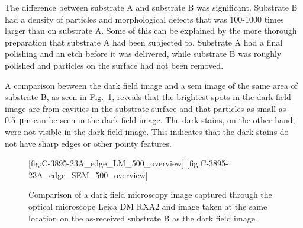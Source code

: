 The difference between substrate A and substrate B was significant. Substrate B had a density of particles and morphological defects that was 100-1000 times larger than on substrate A. Some of this can be explained by the more thorough preparation that substrate A had been subjected to. Substrate A had a final polishing and an etch before it was delivered, while substrate B was roughly polished and particles on the surface had not been removed.

A comparison between the dark field image and a \ac{sem} image of the same area of substrate B, as seen in Fig.~\ref{fig:LM_SEM_C3895}, reveals that the brightest spots in the dark field image are from cavities in the substrate surface and that particles as small as \SI{0.5}{\micro\metre} can be seen in the dark field image. The dark stains, on the other hand, were not visible in the dark field image. This indicates that the dark stains do not have sharp edges or other pointy features.

\begin{figure}[htbp]
    \centering
    [fig:C-3895-23A_edge_LM_500_overview]
    \hfill
    [fig:C-3895-23A_edge_SEM_500_overview]
    \caption[Comparison of dark field microscopy and \ac{sem} images.]{Comparison of  a dark field microscopy image captured through the optical microscope Leica DM RXA2 and   image taken at the same location on the as-received substrate B as the dark field image.}
    \label{fig:LM_SEM_C3895}
\end{figure}


